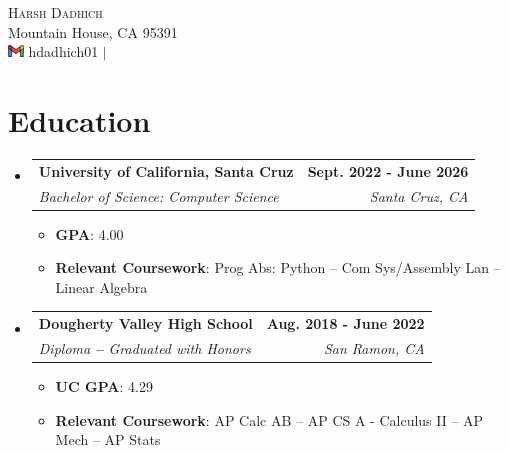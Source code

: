\documentclass[letterpaper,11pt]{article}
\makeatletter
\newcommand{\resumeSubheading}[4]{
  \vspace{-2pt}\item
    \begin{tabular*}{1.0\textwidth}[t]{l@{\extracolsep{\fill}}r}
      \textbf{#1} & \textbf{\small #2} \\
      \textit{\small#3} & \textit{\small #4} \\
    \end{tabular*}\vspace{-7pt}
}
\newcommand{\resumeSubHeadingListStart}{\begin{itemize}[leftmargin=0.0in, label={}]}
\newcommand{\resumeSubHeadingListEnd}{\end{itemize}}
\makeatother
\begin{document}

\begin{center}
	{\Huge \scshape Harsh Dadhich} \\ \vspace{1pt}
	Mountain House, CA 95391 \\ \vspace{1pt}
	\href{mailto:hdadhich01@gmail.com}{\includegraphics[height=9pt]{google-mail.png}} \href{https://linkedin.com/in/hdadhich01}{\faLinkedin} \href{https://github.com/hdadhich01}{\faGithub} hdadhich01 $|$ \href{tel:+12096371007}{\small \raisebox{-0.1\height}}
	\vspace{-15pt}
\end{center}

\section{Education}
\resumeSubHeadingListStart
\resumeSubheading
{University of California, Santa Cruz}{Sept. 2022 - June 2026}
{Bachelor of Science: Computer Science}{Santa Cruz, CA}
\begin{itemize}[itemsep=-1pt, parsep=1pt]
	\item\small \textbf{GPA}{: 4.00}
	\item \textbf{Relevant Coursework}{: Prog Abs: Python -- Com Sys/Assembly Lan -- Linear Algebra}
\end{itemize}
\resumeSubheading
{Dougherty Valley High School}{Aug. 2018 - June 2022}
{Diploma \textbf{--} Graduated with Honors}{San Ramon, CA}
\begin{itemize}[itemsep=-1pt, parsep=1pt]
	\item\small \textbf{UC GPA}{: 4.29}
	\item \textbf{Relevant Coursework}{: AP Calc AB -- AP CS A - Calculus II -- AP Mech -- AP Stats}
\end{itemize}
\resumeSubHeadingListEnd
\vspace{-15pt}
\end{document}
